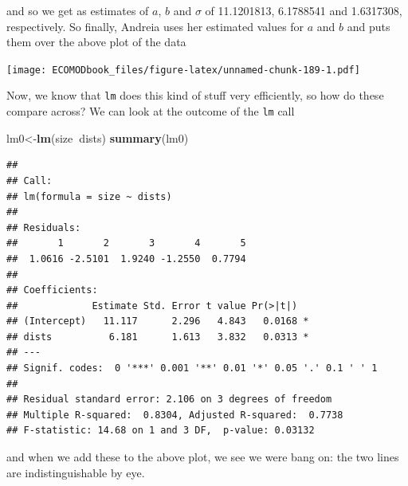 \documentclass[
]{book}
\newenvironment{Shaded}{\begin{snugshade}}{\end{snugshade}}
\newcommand{\DataTypeTok}[1]{\textcolor[rgb]{0.13,0.29,0.53}{#1}}
\newcommand{\DecValTok}[1]{\textcolor[rgb]{0.00,0.00,0.81}{#1}}
\newcommand{\KeywordTok}[1]{\textcolor[rgb]{0.13,0.29,0.53}{\textbf{#1}}}
\newcommand{\NormalTok}[1]{#1}
\newcommand{\OperatorTok}[1]{\textcolor[rgb]{0.81,0.36,0.00}{\textbf{#1}}}
\newcommand{\StringTok}[1]{\textcolor[rgb]{0.31,0.60,0.02}{#1}}
\begin{document}
and so we get as estimates of \(a\), \(b\) and \(\sigma\) of 11.1201813, 6.1788541 and 1.6317308, respectively. So finally, Andreia uses her estimated values for \(a\) and \(b\) and puts them over the above plot of the data

\begin{Shaded}
\end{Shaded}

\texttt{[image: ECOMODbook\_files/figure-latex/unnamed-chunk-189-1.pdf]}

Now, we know that \texttt{lm} does this kind of stuff very efficiently, so how do these compare across? We can look at the outcome of the \texttt{lm} call

\begin{Shaded}
\begin{Highlighting}[]
\NormalTok{lm0<-}\KeywordTok{lm}\NormalTok{(size}\OperatorTok{~}\NormalTok{dists)}
\KeywordTok{summary}\NormalTok{(lm0)}
\end{Highlighting}
\end{Shaded}

\begin{verbatim}
## 
## Call:
## lm(formula = size ~ dists)
## 
## Residuals:
##       1       2       3       4       5 
##  1.0616 -2.5101  1.9240 -1.2550  0.7794 
## 
## Coefficients:
##             Estimate Std. Error t value Pr(>|t|)  
## (Intercept)   11.117      2.296   4.843   0.0168 *
## dists          6.181      1.613   3.832   0.0313 *
## ---
## Signif. codes:  0 '***' 0.001 '**' 0.01 '*' 0.05 '.' 0.1 ' ' 1
## 
## Residual standard error: 2.106 on 3 degrees of freedom
## Multiple R-squared:  0.8304,	Adjusted R-squared:  0.7738 
## F-statistic: 14.68 on 1 and 3 DF,  p-value: 0.03132
\end{verbatim}

and when we add these to the above plot, we see we were bang on: the two lines are indistinguishable by eye.
\end{document}
